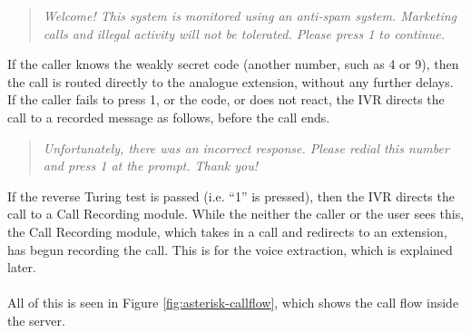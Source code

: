 \documentclass[main.tex]{subfiles}
\begin{document}
\begin{quote}
	\textit{Welcome! This system is monitored using an anti-spam system. Marketing calls and illegal activity will not be tolerated. Please press 1 to continue.}
\end{quote}

If the caller knows the weakly secret code (another number, such as 4 or 9), then the call is routed directly to the analogue extension, without any further delays. If the caller fails to press 1, or the code, or does not react, the IVR directs the call to a recorded message as follows, before the call ends.

\begin{quote}
	\textit{Unfortunately, there was an incorrect response. Please redial this number and press 1 at the prompt. Thank you!}
\end{quote}

If the reverse Turing test is passed (i.e. ``1'' is pressed), then the IVR directs the call to a Call Recording module. While the neither the caller or the user sees this, the Call Recording module, which takes in a call and redirects to an extension, has begun recording the call. This is for the voice extraction, which is explained later.
\\\\
All of this is seen in Figure \ref{fig:asterisk-callflow}, which shows the call flow inside the server.
\end{document}
